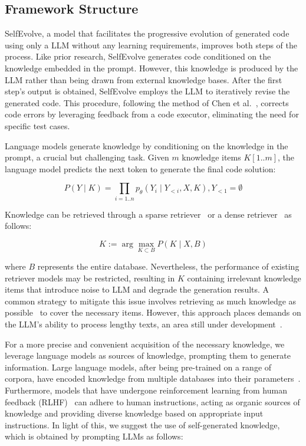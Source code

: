 \documentclass[a4paper,oneside]{book}
\begin{document}
\subsection{Framework Structure}
SelfEvolve, a model that facilitates the progressive evolution of generated code using only a LLM without any learning requirements, improves both steps of the process. Like prior research, SelfEvolve generates code conditioned on the knowledge embedded in the prompt. However, this knowledge is produced by the LLM rather than being drawn from external knowledge bases. After the first step's output is obtained, SelfEvolve employs the LLM to iteratively revise the generated code. This procedure, following the method of Chen et al.~\cite{chen2023teaching}, corrects code errors by leveraging feedback from a code executor, eliminating the need for specific test cases.

Language models generate knowledge by conditioning on the knowledge in the prompt, a crucial but challenging task. Given $m$ knowledge items $K[1 . . m]$, the language model predicts the next token to generate the final code solution:

\begin{equation}
    P(Y \mid K)=\prod_{i=1 . . n} p_{\theta}\left(Y_{i} \mid Y_{<i}, X, K\right), Y_{<1}=\emptyset
\end{equation}

Knowledge can be retrieved through a sparse retriever~\cite{robertson1994some} or a dense retriever~\cite{reimers2019sentence, gao2021simcse} as follows:

\begin{equation}
    K:=\arg \max _{K \subset B} P(K \mid X, B)
\end{equation}

where $B$ represents the entire database. Nevertheless, the performance of existing retriever models may be restricted, resulting in $K$ containing irrelevant knowledge items that introduce noise to LLM and degrade the generation results. A common strategy to mitigate this issue involves retrieving as much knowledge as possible~\cite{borgeaud2022improving} to cover the necessary items. However, this approach places demands on the LLM's ability to process lengthy texts, an area still under development~\cite{li2023context}.

For a more precise and convenient acquisition of the necessary knowledge, we leverage language models as sources of knowledge, prompting them to generate information. Large language models, after being pre-trained on a range of corpora, have encoded knowledge from multiple databases into their parameters~\cite{geva2020transformer}. Furthermore, models that have undergone reinforcement learning from human feedback (RLHF)~\cite{ouyang2022training} can adhere to human instructions, acting as organic sources of knowledge and providing diverse knowledge based on appropriate input instructions. In light of this, we suggest the use of self-generated knowledge, which is obtained by prompting LLMs as follows:
\end{document}
